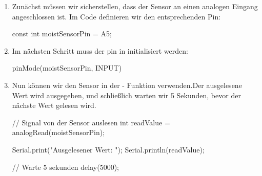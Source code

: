 \begin{enumerate}
	\item  Zunächst müssen wir sicherstellen, dass der Sensor an einen analogen Eingang angeschlossen ist. Im Code definieren wir den entsprechenden Pin:
	
	{
		\begin{Arduino}
			const int moistSensorPin = A5;
		\end{Arduino}
	}
	\item Im nächsten Schritt muss der pin in  initialisiert werden:
	
	{
		\begin{Arduino}
			pinMode(moistSensorPin, INPUT)   
		\end{Arduino}
	}
	\item Nun können wir den Sensor in der  - Funktion verwenden.Der ausgelesene Wert wird ausgegeben, und schließlich warten wir 5 Sekunden, bevor der nächste Wert gelesen wird.
	
	{
		\begin{Arduino}
			// Signal von der Sensor auslesen        
			int readValue = analogRead(moistSensorPin);
			
			Serial.print("Ausgelesener Wert: ");
			Serial.println(readValue);
			
			// Warte 5 sekunden
			delay(5000);
		\end{Arduino}
	}
	
\end{enumerate}







